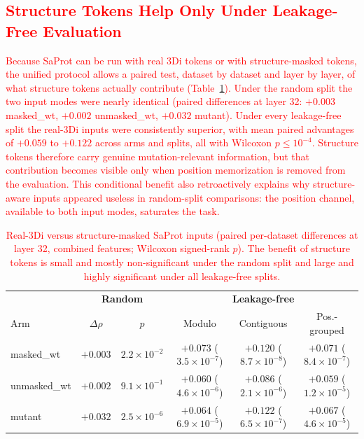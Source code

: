 \documentclass[11pt,a4paper]{article}
\newcommand{\revised}[1]{\textcolor{red}{#1}}
\begin{document}
\subsection{\revised{Structure Tokens Help Only Under Leakage-Free Evaluation}}

\revised{Because SaProt can be run with real 3Di tokens or with structure-masked
tokens, the unified protocol allows a paired test, dataset by dataset and layer by
layer, of what structure tokens actually contribute (Table~\ref{tab:3di}). Under the
random split the two input modes were nearly identical (paired differences at layer
32: $+0.003$ masked\_wt, $+0.002$ unmasked\_wt, $+0.032$ mutant). Under every
leakage-free split the real-3Di inputs were consistently superior, with mean paired
advantages of $+0.059$ to $+0.122$ across arms and splits, all with Wilcoxon
$p \leq 10^{-4}$. Structure tokens therefore carry genuine mutation-relevant
information, but that contribution becomes visible only when position memorization
is removed from the evaluation. This conditional benefit also retroactively
explains why structure-aware inputs appeared useless in random-split comparisons:
the position channel, available to both input modes, saturates the task.}

\begin{table}[ht]
\centering
\caption{\revised{Real-3Di versus structure-masked SaProt inputs (paired per-dataset
differences at layer 32, combined features; Wilcoxon signed-rank $p$). The benefit of
structure tokens is small and mostly non-significant under the random split and
large and highly significant under all leakage-free splits.}}
\label{tab:3di}
\begin{tabular}{lcc|ccc}
\toprule
& \multicolumn{2}{c|}{\textbf{Random}} & \multicolumn{3}{c}{\textbf{Leakage-free}} \\
Arm & $\Delta\rho$ & $p$ & Modulo & Contiguous & Pos.-grouped \\
\midrule
masked\_wt   & $+0.003$ & $2.2 \times 10^{-2}$ & $+0.073$ ($3.5 \times 10^{-7}$) & $+0.120$ ($8.7 \times 10^{-8}$) & $+0.071$ ($8.4 \times 10^{-7}$) \\
unmasked\_wt & $+0.002$ & $9.1 \times 10^{-1}$ & $+0.060$ ($4.6 \times 10^{-6}$) & $+0.086$ ($2.1 \times 10^{-6}$) & $+0.059$ ($1.2 \times 10^{-5}$) \\
mutant       & $+0.032$ & $2.5 \times 10^{-6}$ & $+0.064$ ($6.9 \times 10^{-5}$) & $+0.122$ ($6.5 \times 10^{-7}$) & $+0.067$ ($4.6 \times 10^{-5}$) \\
\bottomrule
\end{tabular}
\end{table}
\end{document}
